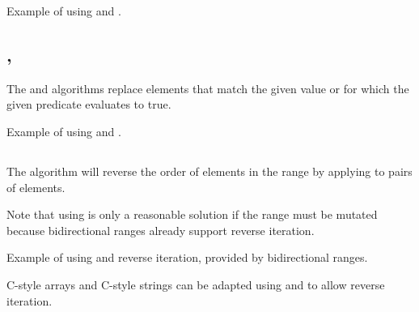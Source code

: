 \begin{box-note}
\footnotesize Example of using  and .
\tcblower
{}
\end{box-note}

\subsection{\texorpdfstring{, }{\texttt{std::replace}, \texttt{std::replace\_if}}}

The  and  algorithms replace elements that match the given value or for which the given predicate evaluates to true.


\begin{box-note}
\footnotesize Example of using  and .
\tcblower
{}
\end{box-note}

\subsection{\texorpdfstring{}{\texttt{std::reverse}}}

The  algorithm will reverse the order of elements in the range by applying  to pairs of elements.


Note that using  is only a reasonable solution if the range must be mutated because bidirectional ranges already support reverse iteration.

\begin{box-note}
\footnotesize Example of using  and reverse iteration, provided by bidirectional ranges.
\tcblower
{}
\end{box-note}

C-style arrays and C-style strings can be adapted using  and  to allow reverse iteration.

